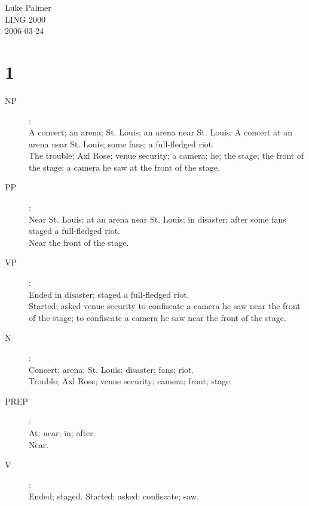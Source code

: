 \documentclass[12pt]{article}
\begin{document}
\noindent
Luke Palmer \\
LING 2000 \\
2006-03-24

\section*{1}

\begin{description}
\item[NP]: \\
A concert; an arena; St. Louis; an arena near St. Louis; 
  A concert at an arena near St. Louis; some fans;
  a full-fledged riot. \\
The trouble; Axl Rose; venue security; a camera; he; the stage;
  the front of the stage; a camera he saw at the front of the stage.
\item[PP]: \\
Near St. Louis; at an arena near St. Louis; in disaster; after some
  fans staged a full-fledged riot. \\
Near the front of the stage.
\item[VP]: \\
Ended in disaster; staged a full-fledged riot. \\
Started; asked venue security to confiscate a camera he saw near the
front of the stage; to confiscate a camera he saw near the front of the
stage.
\item[N]: \\
Concert; arena; St. Louis; disaster; fans; riot. \\
Trouble; Axl Rose; venue security; camera; front; stage.
\item[PREP]: \\
At; near; in; after. \\
Near.
\item[V]: \\
Ended; staged.
Started; asked; confiscate; saw.
\end{description}
\end{document}
